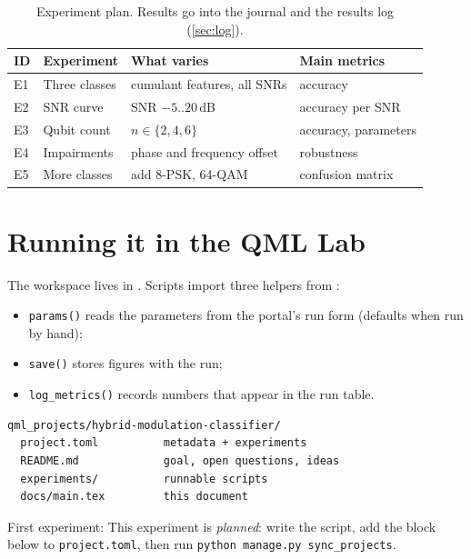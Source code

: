 \documentclass[11pt,a4paper]{article}
\begin{document}
\begin{table}[h]
\centering\small
\begin{tabularx}{\linewidth}{@{}l>{\raggedright}X>{\raggedright}X>{\raggedright\arraybackslash}X@{}}
\toprule
ID & Experiment & What varies & Main metrics \\
\midrule
  E1 & Three classes & cumulant features, all SNRs & accuracy \\
  E2 & SNR curve & SNR $-5..20$\,dB & accuracy per SNR \\
  E3 & Qubit count & $n\in\{2,4,6\}$ & accuracy, parameters \\
  E4 & Impairments & phase and frequency offset & robustness \\
  E5 & More classes & add 8-PSK, 64-QAM & confusion matrix \\
\bottomrule
\end{tabularx}
\caption{Experiment plan. Results go into the journal and the results log (\cref{sec:log}).}
\end{table}

\section{Running it in the QML Lab}
The workspace lives in . Scripts import three helpers from
:
\begin{itemize}
  \item \texttt{params()} reads the parameters from the portal's run form (defaults when run by hand);
  \item \texttt{save()} stores figures with the run;
  \item \texttt{log\_metrics()} records numbers that appear in the run table.
\end{itemize}

\begin{lstlisting}
qml_projects/hybrid-modulation-classifier/
  project.toml          metadata + experiments
  README.md             goal, open questions, ideas
  experiments/          runnable scripts
  docs/main.tex         this document
\end{lstlisting}

First experiment: This experiment is \emph{planned}: write the script, add the block below to \texttt{project.toml}, then run \texttt{python manage.py sync\_projects}.
\end{document}
